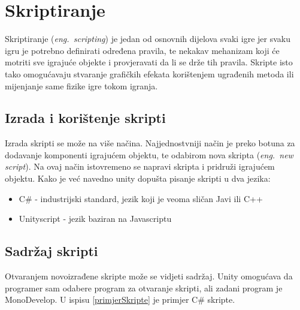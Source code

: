 \section{Skriptiranje}
Skriptiranje (\emph{eng.~scripting}) je jedan od osnovnih dijelova svaki igre jer svaku igru je potrebno definirati određena pravila, te nekakav mehanizam koji će motriti sve igrajuće objekte i provjeravati da li se drže tih pravila. Skripte isto tako omogućavaju stvaranje grafičkih efekata korištenjem ugrađenih metoda ili mijenjanje same fizike igre tokom igranja.
\subsection{Izrada i korištenje skripti}
Izrada skripti se može na više načina. Najjednostvniji način je preko botuna za dodavanje komponenti igrajućem objektu, te odabirom nova skripta (\emph{eng.~new script}). Na ovaj način istovremeno se napravi skripta i pridruži igrajućem objektu. Kako je već navedno unity dopušta pisanje skripti u dva jezika:
\begin{itemize} 
	\item C\# - industrijski standard, jezik koji je veoma sličan Javi ili C++
	\item Unityscript - jezik baziran na Javascriptu
\end{itemize}
\subsection{Sadržaj skripti}
Otvaranjem novoizrađene skripte može se vidjeti sadržaj. Unity omogućava da programer sam odabere program za otvaranje skripti, ali zadani program je MonoDevelop. U ispisu \ref{primjerSkripte}  je primjer C\# skripte.


